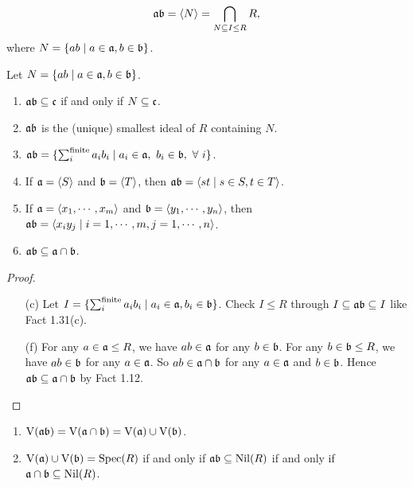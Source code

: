 \begin{definition}
    \[\mathfrak{a} \mathfrak{b} = \langle N \rangle = \bigcap_{N \subseteq I \leq R}R,\] where $N = \{ab \mid a \in \mathfrak{a},b \in \mathfrak{b}\}$.
\end{definition}

\begin{fact}
    Let $N = \{ab \mid a \in \mathfrak{a},b \in \mathfrak{b}\}$.
    \begin{enumerate}
        \item $\mathfrak{a} \mathfrak{b} \subseteq \mathfrak{c}$ if and only if $N \subseteq \mathfrak{c}$.
        \item $\mathfrak{a} \mathfrak{b}$ is the (unique) smallest ideal of $R$ containing $N$.
        \item $\mathfrak{a}\mathfrak{b} = \{\sum_{i}^{\text{finite}}a_ib_i \mid a_i \in \mathfrak{a},\ b_i \in \mathfrak{b}, \ \forall \  i\}$.
        \item If $\mathfrak{a} = \langle S \rangle$ and $\mathfrak{b} = \langle T \rangle$, then $\mathfrak{a}\mathfrak{b} = \langle st \mid s \in S, t \in T\rangle$.
        \item If $\mathfrak{a} = \langle x_1,\cdots,x_m \rangle$ and $\mathfrak{b} = \langle y_1,\cdots,y_n \rangle$, then $\mathfrak{a}\mathfrak{b} = \langle x_iy_j \mid i = 1,\cdots,m,j = 1,\cdots,n \rangle$.
        \item $\mathfrak{a} \mathfrak{b} \subseteq \mathfrak{a} \cap \mathfrak{b}$.
    \end{enumerate}
\end{fact}

\begin{proof}
    \begin{enumerate}
        \item [(c)]
            Let $I = \{\sum_{i}^{\text{finite}} a_ib_i \mid a_i \in \mathfrak{a},b_i \in \mathfrak{b}\}$. Check $I \leq R$ through $I \subseteq \mathfrak{a} \mathfrak{b} \subseteq I$ like Fact 1.31(c).
        \item [(f)]
            For any $a \in \mathfrak{a} \leq R$, we have $ab \in \mathfrak{a}$ for any $b \in \mathfrak{b}$. For any $b \in \mathfrak{b} \leq R$, we have $ab \in \mathfrak{b}$ for any $a \in \mathfrak{a}$. So $ab \in \mathfrak{a} \cap \mathfrak{b}$ for any $a \in \mathfrak{a}$ and $b \in \mathfrak{b}$. Hence $\mathfrak{a} \mathfrak{b} \subseteq \mathfrak{a} \cap \mathfrak{b}$ by Fact 1.12. \qedhere
    \end{enumerate}
\end{proof}

\begin{proposition}
    \begin{enumerate}
        \item 
            $\operatorname{V}(\mathfrak{a} \mathfrak{b}) = \operatorname{V}(\mathfrak{a} \cap \mathfrak{b}) = \operatorname{V}(\mathfrak{a}) \cup \operatorname{V}(\mathfrak{b})$.
        \item 
            $\operatorname{V}(\mathfrak{a}) \cup \operatorname{V}(\mathfrak{b}) = \operatorname{Spec}(R)$ if and only if $\mathfrak{a} \mathfrak{b} \subseteq \operatorname{Nil}(R)$ if and only if $\mathfrak{a} \cap \mathfrak{b} \subseteq \operatorname{Nil}(R)$.
    \end{enumerate}
\end{proposition}

